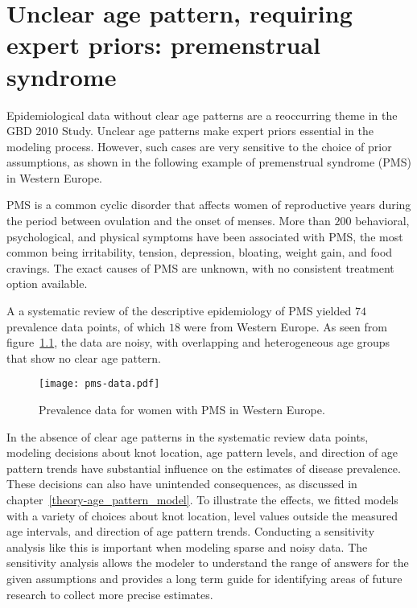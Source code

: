 \chapter{Unclear age pattern, requiring expert priors: premenstrual syndrome}
\label{applications-priors_knots_select}

Epidemiological data without clear age patterns are a reoccurring
theme in the GBD 2010 Study.  Unclear age patterns make expert priors
essential in the modeling process.  However, such cases are very
sensitive to the choice of prior assumptions, as shown in the
following example of premenstrual syndrome (PMS) in Western Europe.

PMS is a common cyclic disorder that affects women of reproductive
years during the period between ovulation and the onset of menses.
More than $200$ behavioral, psychological, and physical symptoms have been
associated with PMS, the most common being irritability, tension,
depression, bloating, weight gain, and food cravings.  The exact causes
of PMS are unknown, with no consistent
treatment option available. \cite{dickerson_premenstrual_2003, singh_incidence_1998,
  goodale_alleviation_1990}

A a systematic review of the descriptive
epidemiology of PMS yielded $74$ prevalence
data points, of which $18$ were from Western Europe.\cite{vos_global_2012}
  As seen from
figure~\ref{fig:app-pms_data}, the data are noisy, with overlapping and
heterogeneous age groups that show no clear age pattern.

    \begin{figure}[h]
        \begin{center}
            \texttt{[image: pms-data.pdf]}
        \end{center}
        \caption[Systematic review data for premenstrual syndrome.]{Prevalence 
          data for women with PMS in Western Europe.}
        \label{fig:app-pms_data}
    \end{figure}


In the absence of clear age patterns in the systematic review data
points, modeling decisions about knot location, age pattern levels, and
direction of age pattern trends have substantial influence on the estimates of
disease prevalence.  These decisions can also have unintended
consequences, as discussed in chapter~\ref{theory-age_pattern_model}.
To illustrate the effects, we fitted models with a variety of choices
about knot location, level values outside the measured age
intervals, and direction of age pattern trends.  Conducting a sensitivity analysis
like this is important when modeling sparse and noisy data.  The sensitivity analysis allows 
the modeler to understand the range of answers for the given assumptions 
and provides a long term guide for identifying areas of future research 
to collect more precise estimates.

